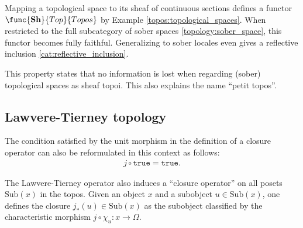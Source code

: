     \begin{property}
        Mapping a topological space to its sheaf of continuous sections defines a functor $\func{\mathbf{Sh}}{Top}{Topos}$ by Example \ref{topos:topological_spaces}. When restricted to the full subcategory of sober spaces \ref{topology:sober_space}, this functor becomes fully faithful. Generalizing to sober locales even gives a reflective inclusion \ref{cat:reflective_inclusion}.

        This property states that no information is lost when regarding (sober) topological spaces as sheaf topoi. This also explains the name ``petit topos''.
    \end{property}

\subsection{Lawvere-Tierney topology}

    \begin{remark}
        The condition satisfied by the unit morphism in the definition of a closure operator can also be reformulated in this context as follows:
        \begin{gather}
            j\circ\texttt{true} = \texttt{true}.
        \end{gather}
    \end{remark}
    The Lawvere-Tierney operator also induces a ``closure operator'' on all posets $\mathrm{Sub}(x)$ in the topos. Given an object $x$ and a subobject $u\in\text{Sub}(x)$, one defines the closure $j_\ast(u)\in\text{Sub}(x)$ as the subobject classified by the characteristic morphism $j\circ\chi_u:x\rightarrow\Omega$.

